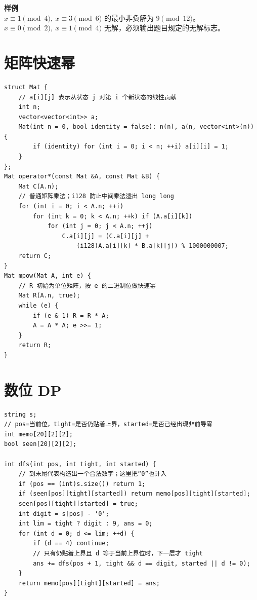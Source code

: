 \begin{card}
\textbf{样例}\\
\(x\equiv1\pmod4,\ x\equiv3\pmod6\) 的最小非负解为 \(9\pmod{12}\)。\\
\(x\equiv0\pmod2,\ x\equiv1\pmod4\) 无解，必须输出题目规定的无解标志。
\end{card}

\section{矩阵快速幂}


\begin{lstlisting}[style=cpp]
struct Mat {
    // a[i][j] 表示从状态 j 对第 i 个新状态的线性贡献
    int n;
    vector<vector<int>> a;
    Mat(int n = 0, bool identity = false): n(n), a(n, vector<int>(n)) {
        if (identity) for (int i = 0; i < n; ++i) a[i][i] = 1;
    }
};
Mat operator*(const Mat &A, const Mat &B) {
    Mat C(A.n);
    // 普通矩阵乘法；i128 防止中间乘法溢出 long long
    for (int i = 0; i < A.n; ++i)
        for (int k = 0; k < A.n; ++k) if (A.a[i][k])
            for (int j = 0; j < A.n; ++j)
                C.a[i][j] = (C.a[i][j] +
                    (i128)A.a[i][k] * B.a[k][j]) % 1000000007;
    return C;
}
Mat mpow(Mat A, int e) {
    // R 初始为单位矩阵，按 e 的二进制位做快速幂
    Mat R(A.n, true);
    while (e) {
        if (e & 1) R = R * A;
        A = A * A; e >>= 1;
    }
    return R;
}
\end{lstlisting}

\section{数位 DP}


\begin{lstlisting}[style=cpp]
string s;
// pos=当前位，tight=是否仍贴着上界，started=是否已经出现非前导零
int memo[20][2][2];
bool seen[20][2][2];

int dfs(int pos, int tight, int started) {
    // 到末尾代表构造出一个合法数字；这里把“0”也计入
    if (pos == (int)s.size()) return 1;
    if (seen[pos][tight][started]) return memo[pos][tight][started];
    seen[pos][tight][started] = true;
    int digit = s[pos] - '0';
    int lim = tight ? digit : 9, ans = 0;
    for (int d = 0; d <= lim; ++d) {
        if (d == 4) continue;
        // 只有仍贴着上界且 d 等于当前上界位时，下一层才 tight
        ans += dfs(pos + 1, tight && d == digit, started || d != 0);
    }
    return memo[pos][tight][started] = ans;
}
\end{lstlisting}

